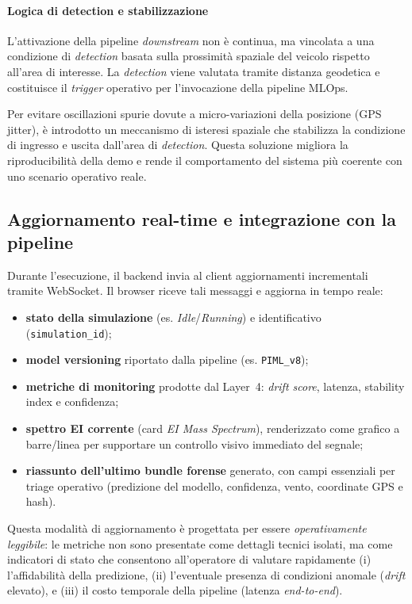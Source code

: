 \paragraph{Logica di detection e stabilizzazione}

L’attivazione della pipeline \textit{downstream} non è continua, ma vincolata a una condizione di \textit{detection} basata sulla prossimità spaziale del veicolo rispetto all’area di interesse.
La \textit{detection} viene valutata tramite distanza geodetica e costituisce il \textit{trigger} operativo per l’invocazione della pipeline MLOps.

Per evitare oscillazioni spurie dovute a micro-variazioni della posizione (GPS jitter), è introdotto un meccanismo di isteresi spaziale che stabilizza la condizione di ingresso e uscita dall’area di \textit{detection}.
Questa soluzione migliora la riproducibilità della demo e rende il comportamento del sistema più coerente con uno scenario operativo reale.

\subsection{Aggiornamento real-time e integrazione con la pipeline}

Durante l’esecuzione, il backend invia al client aggiornamenti incrementali tramite WebSocket.
Il browser riceve tali messaggi e aggiorna in tempo reale:

\begin{itemize}
	\item \textbf{stato della simulazione} (es. \textit{Idle}/\textit{Running}) e identificativo (\texttt{simulation\_id});
	\item \textbf{model versioning} riportato dalla pipeline (es. \texttt{PIML\_v8});
	\item \textbf{metriche di monitoring} prodotte dal Layer~4: \textit{drift score}, latenza, stability index e confidenza;
	\item \textbf{spettro EI corrente} (card \emph{EI Mass Spectrum}), renderizzato come grafico a barre/linea per supportare un controllo visivo immediato del segnale;
	\item \textbf{riassunto dell’ultimo bundle forense} generato, con campi essenziali per triage operativo (predizione del modello, confidenza, vento, coordinate GPS e hash).
\end{itemize}

Questa modalità di aggiornamento è progettata per essere \emph{operativamente leggibile}: le metriche non sono presentate come dettagli tecnici isolati, ma come indicatori di stato che consentono all’operatore di valutare rapidamente (i) l’affidabilità della predizione, (ii) l’eventuale presenza di condizioni anomale (\textit{drift} elevato), e (iii) il costo temporale della pipeline (latenza \textit{end-to-end}).

